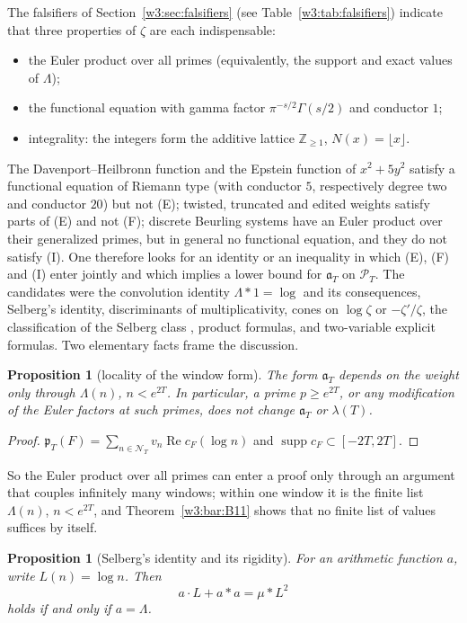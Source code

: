 \documentclass[11pt]{amsart}
\newtheorem{proposition}[theorem]{Proposition}
\theoremstyle{definition}
\theoremstyle{remark}
\numberwithin{equation}{section}
\newcommand{\Z}{\mathbb{Z}}
\DeclareMathOperator{\Rel}{Re}
\DeclareMathOperator{\supp}{supp}
\newcommand{\cF}{c_F}                                  %
\newcommand{\PT}{\mathcal{P}_T}                        %
\newcommand{\NT}{\mathcal{N}_T}                        %
\newcommand{\pT}{\mathfrak{p}_T}                       %
\newcommand{\aT}{\mathfrak{a}_T}                       %
\newcommand{\lam}{\lambda(T)}                          %
\begin{document}
The falsifiers of Section~\ref{w3:sec:falsifiers} (see Table~\ref{w3:tab:falsifiers}) indicate that three
properties of $\zeta$ are each indispensable:
\begin{itemize}
\item[(E)] the Euler product over all primes (equivalently, the support and exact values of $\Lambda$);
\item[(F)] the functional equation with gamma factor $\pi^{-s/2}\Gamma(s/2)$ and conductor $1$;
\item[(I)] integrality: the integers form the additive lattice $\Z_{\ge1}$, $N(x)=\lfloor x\rfloor$.
\end{itemize}
The Davenport--Heilbronn function and the Epstein function of $x^2+5y^2$ satisfy a functional equation of
Riemann type (with conductor $5$, respectively degree two and conductor $20$) but not (E); twisted, truncated
and edited weights satisfy parts of (E) and not (F); discrete Beurling systems have an Euler product over
their generalized primes, but in general no functional equation, and they do not satisfy (I). One therefore
looks for an identity or an inequality in which (E), (F) and (I) enter jointly and which implies a lower bound
for $\aT$ on $\PT$. The candidates were the convolution identity $\Lambda\ast1=\log$ and its consequences,
Selberg's identity, discriminants of multiplicativity, cones on $\log\zeta$ or $-\zeta'/\zeta$, the
classification of the Selberg class \cite{Selberg1992}, product formulas, and two-variable explicit formulas.
Two elementary facts frame the discussion.

\begin{proposition}[locality of the window form]\label{w7:prop:local}
The form $\aT$ depends on the weight only through $\Lambda(n)$, $n<e^{2T}$. In particular, a prime
$p\ge e^{2T}$, or any modification of the Euler factors at such primes, does not change $\aT$ or $\lam$.
\end{proposition}

\begin{proof}
$\pT(F)=\sum_{n\in\NT}v_n\Rel\cF(\log n)$ and $\supp\cF\subset[-2T,2T]$.
\end{proof}

So the Euler product over all primes can enter a proof only through an argument that couples infinitely many
windows; within one window it is the finite list $\Lambda(n)$, $n<e^{2T}$, and Theorem~\ref{w3:bar:B11} shows
that no finite list of values suffices by itself.

\begin{proposition}[Selberg's identity and its rigidity]\label{w7:prop:selberg}
For an arithmetic function $a$, write $L(n)=\log n$. Then
\begin{equation}\label{w7:eq:selberg}
  a\cdot L+a\ast a=\mu\ast L^2
\end{equation}
holds if and only if $a=\Lambda$.
\end{proposition}
\end{document}
